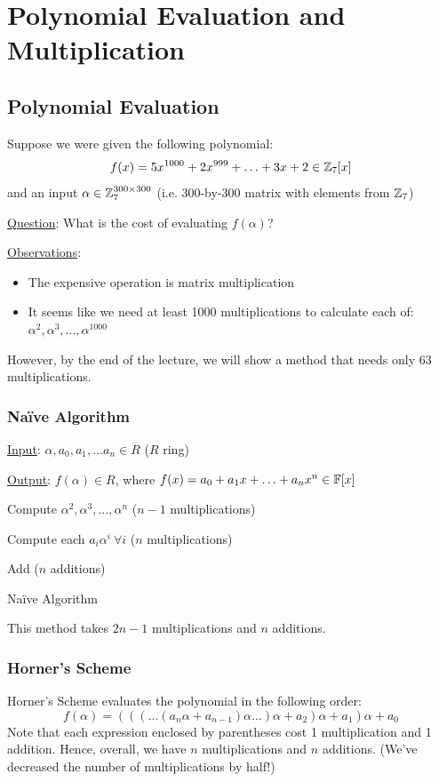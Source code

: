 \section{Polynomial Evaluation and Multiplication}

\subsection{Polynomial Evaluation}
Suppose we were given the following polynomial:
\begin{equation*}
    f(x) = 5x^{1000} + 2x^{999} + \ldots + 3x +2 \in \operatorname{\mathbb{Z}}_7[x]
\end{equation*}
and an input $\alpha \in \operatorname{\mathbb{Z}}_7^{300 \times 300}$ (i.e. 300-by-300 matrix with elements from $\operatorname{\mathbb{Z}}_7$)

\underline{Question}: What is the cost of evaluating $f(\alpha)$?

\underline{Observations}:
\begin{itemize}
    \item The expensive operation is matrix multiplication
    \item It seems like we need at least 1000 multiplications to calculate each of: $\alpha^2, \alpha^3, \ldots, \alpha^{1000}$
\end{itemize}

However, by the end of the lecture, we will show a method that needs only $63$ multiplications.

\subsubsection{Naïve Algorithm}
\IncMargin{1em}
\begin{algorithm}[H]
    \underline{Input}: $\alpha, a_0, a_1, \ldots a_n \in R$ ($R$ ring)

    \underline{Output}: $f(\alpha) \in R$, where $f(x) = a_0 + a_1x + \ldots + a_nx^n \in \operatorname{\mathbb{F}}[x]$

    \BlankLine
    \nl Compute $\alpha^2, \alpha^3, \ldots, \alpha^n$ ($n - 1$ multiplications)

    \nl Compute each $a_i\alpha^i \ \forall i$ ($n$ multiplications)

    \nl Add ($n$ additions)
    \caption{Naïve Algorithm}
\end{algorithm}

This method takes $2n-1$ multiplications and $n$ additions.

\subsubsection{Horner's Scheme}
Horner's Scheme evaluates the polynomial in the following order:
\begin{equation}
    f(\alpha) = (((\ldots(a_n\alpha + a_{n-1})\alpha\ldots)\alpha + a_2)\alpha + a_1)\alpha + a_0
\end{equation}
Note that each expression enclosed by parentheses cost 1 multiplication and 1 addition.
Hence, overall, we have $n$ multiplications and $n$ additions.
(We've decreased the number of multiplications by half!)

